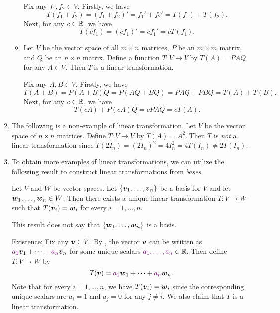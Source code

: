 \begin{enumerate}
\begin{itemize}
\begin{pf}
Fix any \(f_1,f_2\in V\). Firstly, we have
\[
T(f_1+f_2)=(f_1+f_2)'=f_1'+f_2'=T(f_1)+T(f_2).
\]
Next, for any \(c\in\mathbb{R}\), we have
\[
T(cf_1)=(cf_1)'=cf_1'=cT(f_1).
\]
\end{pf}
\item Let \(V\) be the vector space of all \(m\times n\) matrices, \(P\) be an
\(m\times m\) matrix, and \(Q\) be an \(n\times n\) matrix. Define a function
\(T:V\to V\) by \(T(A)=PAQ\) for any \(A\in V\). Then \(T\) is a linear
transformation.

\begin{pf}
Fix any \(A,B\in V\). Firstly, we have
\[
T(A+B)=P(A+B)Q=P(AQ+BQ)=PAQ+PBQ=T(A)+T(B).
\]
Next, for any \(c\in\mathbb{R}\), we have
\[
T(cA)+P(cA)Q=cPAQ=cT(A).
\]
\end{pf}
\end{itemize}
\item The following is a \underline{non}-example of linear transformation. Let
\(V\) be the vector space of \(n\times n\) matrices. Define \(T:V\to V\) by
\(T(A)=A^{2}\). Then \(T\) is \emph{not} a linear transformation since
\(T(2I_n)=(2I_n)^{2}=4I_n^{2}=4T(I_n)\ne 2T(I_n)\).

\item To obtain more examples of linear transformations, we can utilize the
following result to construct linear transformations from \emph{bases}.

\begin{theorem}
\label{thm:construct-lt-from-basis}
Let \(V\) and \(W\) be vector spaces. Let \(\{\vb*{v}_1,\dotsc,\vb*{v}_n\}\)
be a basis for \(V\) and let \(\vb*{w}_1,\dotsc,\vb*{w}_n\in W\). Then there
exists a unique linear transformation \(T:V\to W\) such that
\(T(\vb*{v}_i)=\vb*{w}_i\) for every \(i=1,\dotsc,n\).
\end{theorem}
\begin{note}
This result does \underline{not} say that \(\{\vb*{w}_1,\dotsc,\vb*{w}_n\}\)
is a basis.
\end{note}

\begin{pf}
\underline{Existence}: Fix any \(\vb*{v}\in V\). By
, the vector \(\vb*{v}\) can be written as
\({\color{violet}a_1}\vb*{v}_1+\dotsb+{\color{violet}a_n}\vb*{v}_n\) for some unique scalars
\({\color{violet}a_1,\dotsc,a_n}\in\mathbb{R}\). Then define \(T:V\to W\) by
\[
T(\vb*{v})={\color{violet}a_1}\vb*{w}_1+\dotsb+{\color{violet}a_n}\vb*{w}_n.
\]
Note that for every \(i=1,\dotsc,n\), we have \(T(\vb*{v}_i)=\vb*{w}_i\)
since the corresponding unique scalars are \(a_i=1\) and \(a_j=0\) for any
\(j\ne i\). We also claim that \(T\) is a linear transformation.


\end{pf}
\end{enumerate}
